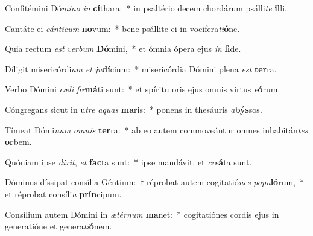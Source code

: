 \item Confitémini Dó\textit{mi}\textit{no} \textit{in} \textbf{cí}thara:~* in psaltério decem chordárum psálli\textit{te} \textbf{il}li.
\item Cantáte ei \textit{cán}\textit{ti}\textit{cum} \textbf{no}vum:~* bene psállite ei in vocifera\textit{ti}\textbf{ó}ne.
\item Quia rectum \textit{est} \textit{ver}\textit{bum} \textbf{Dó}mini,~* et ómnia ópera ejus \textit{in} \textbf{fi}de.
\item Díligit misericórdi\textit{am} \textit{et} \textit{ju}\textbf{dí}cium:~* misericórdia Dómini plena \textit{est} \textbf{ter}ra.
\item Verbo Dómini \textit{cæ}\textit{li} \textit{fir}\textbf{má}ti sunt:~* et spíritu oris ejus omnis virtus \textit{e}\textbf{ó}rum.
\item Cóngregans sicut in u\textit{tre} \textit{a}\textit{quas} \textbf{ma}ris:~* ponens in thesáuris \textit{a}\textbf{býs}sos.
\item Tímeat Dómi\textit{num} \textit{om}\textit{nis} \textbf{ter}ra:~* ab eo autem commoveántur omnes inhabitán\textit{tes} \textbf{or}bem.
\item Quóniam ipse \textit{di}\textit{xit}, \textit{et} \textbf{fac}ta sunt:~* ipse mandávit, et \textit{cre}\textbf{á}ta sunt.
\item Dóminus díssipat consília Géntium:~† réprobat autem cogitatió\textit{nes} \textit{po}\textit{pu}\textbf{ló}rum,~* et réprobat consíli\textit{a} \textbf{prín}cipum.
\item Consílium autem Dómini in \textit{æ}\textit{tér}\textit{num} \textbf{ma}net:~* cogitatiónes cordis ejus in generatióne et genera\textit{ti}\textbf{ó}nem.
